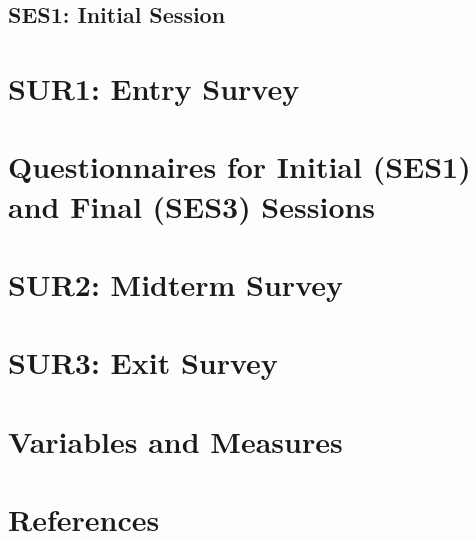 \documentclass[a4paper, nobind]{templates/ociamthesis}
\begin{document}
\hypertarget{ses1-initial-session-1}{%
\section{SES1: Initial Session}\label{ses1-initial-session-1}}

\hypertarget{app_signup_survey}{%
\chapter{SUR1: Entry Survey}\label{app_signup_survey}}

\hypertarget{app_pre_post_tasks}{%
\chapter{Questionnaires for Initial (SES1) and Final (SES3) Sessions}\label{app_pre_post_tasks}}

\hypertarget{app_midterm_survey}{%
\chapter{SUR2: Midterm Survey}\label{app_midterm_survey}}

\hypertarget{app_final_survey}{%
\chapter{SUR3: Exit Survey}\label{app_final_survey}}

\hypertarget{app_variables}{%
\chapter{Variables and Measures}\label{app_variables}}

\hypertarget{references}{%
\chapter*{References}\label{references}}

\end{document}
